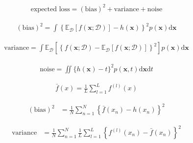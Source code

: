 \documentclass{article}
\begin{document}
\begin{align*}
\text{expected loss} = (\text{bias})^{2} + \text{variance} + \text{noise}
\tag{4.46}
\end{align*}

\begin{align*}
(\text{bias})^{2} = \int \left\{ \mathbb{E}_{\mathcal{D}}[f(\mathbf{x} ; \mathcal{D})] - h(\mathbf{x}) \right\}^{2} p(\mathbf{x}) \mathrm{d} \mathbf{x}
\tag{4.47}
\end{align*}

\begin{align*}
\text{variance} = \int \mathbb{E}_{\mathcal{D}} \left[ \left\{ f(\mathbf{x} ; \mathcal{D}) - \mathbb{E}_{\mathcal{D}}[f(\mathbf{x} ; \mathcal{D})] \right\}^{2} \right] p(\mathbf{x}) \mathrm{d} \mathbf{x}
\tag{4.48}
\end{align*}

\begin{align*}
\text{noise} = \iint \{h(\mathbf{x}) - t\}^{2} p(\mathbf{x}, t) \mathrm{d} \mathbf{x} \mathrm{d} t
\tag{4.49}
\end{align*}

\begin{align*}
\bar{f}(x) = \frac{1}{L} \sum_{l=1}^{L} f^{(l)}(x)
\tag{4.50}
\end{align*}

\begin{align*}
(\text{bias})^{2} & = \frac{1}{N} \sum_{n=1}^{N} \left\{ \bar{f}(x_n) - h(x_n) \right\}^{2}
\tag{4.51}
\end{align*}

\begin{align*}
\text{variance} & = \frac{1}{N} \sum_{n=1}^{N} \frac{1}{L} \sum_{l=1}^{L} \left\{ f^{(l)}(x_n) - \bar{f}(x_n) \right\}^{2}
\tag{4.52}
\end{align*}
\end{document}

